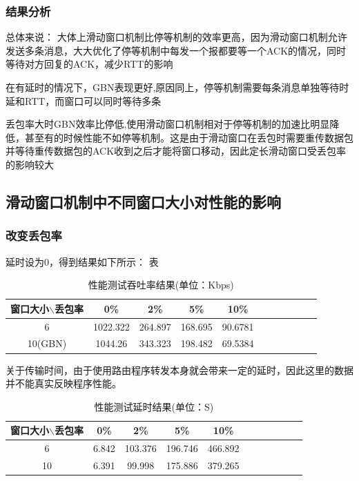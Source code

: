 \documentclass[UTF8,a4paper,10pt]{ctexart}
\begin{document}
\subsubsection{结果分析}
总体来说：
大体上滑动窗口机制比停等机制的效率更高，因为滑动窗口机制允许发送多条消息，大大优化了停等机制中每发一个报都要等一个ACK的情况，同时等待对方回复的ACK，减少RTT的影响\par
在有延时的情况下，GBN表现更好,原因同上，停等机制需要每条消息单独等待时延和RTT，而窗口可以同时等待多条\par
丢包率大时GBN效率比停低,使用滑动窗口机制相对于停等机制的加速比明显降低，甚至有的时候性能不如停等机制。这是由于滑动窗口在丢包时需要重传数据包并等待重传数据包的ACK收到之后才能将窗口移动，因此定长滑动窗口受丢包率的影响较大
\subsection{滑动窗口机制中不同窗口大小对性能的影响}
\subsubsection{改变丢包率}
延时设为0，得到结果如下所示：
表
\begin{table}[!htbp]
  \centering
  \begin{tabular}{ccccccccccc}
  \toprule  
  窗口大小$\backslash$丢包率& 0\%& 2\%& 5\%& 10\%\\
  \midrule
  6& 1022.322& 264.897& 168.695& 90.6781\\
  10(GBN)& 1044.26& 343.323& 198.482& 69.5384\\
  \bottomrule
  \end{tabular}
  \caption{性能测试吞吐率结果(单位：Kbps)}
\end{table}

关于传输时间，由于使用路由程序转发本身就会带来一定的延时，因此这里的数据并不能真实反映程序性能。
\begin{table}[!htbp]
  \centering
  \begin{tabular}{ccccccccccc}
  \toprule  
  窗口大小$\backslash$丢包率& 0\%& 2\%& 5\%& 10\%\\
  \midrule
  6& 6.842& 103.376& 196.746& 466.892\\
  10& 6.391& 99.998& 175.886& 379.265\\
  \bottomrule
  \end{tabular}
  \caption{性能测试延时结果(单位：S)}
\end{table}
\end{document}
